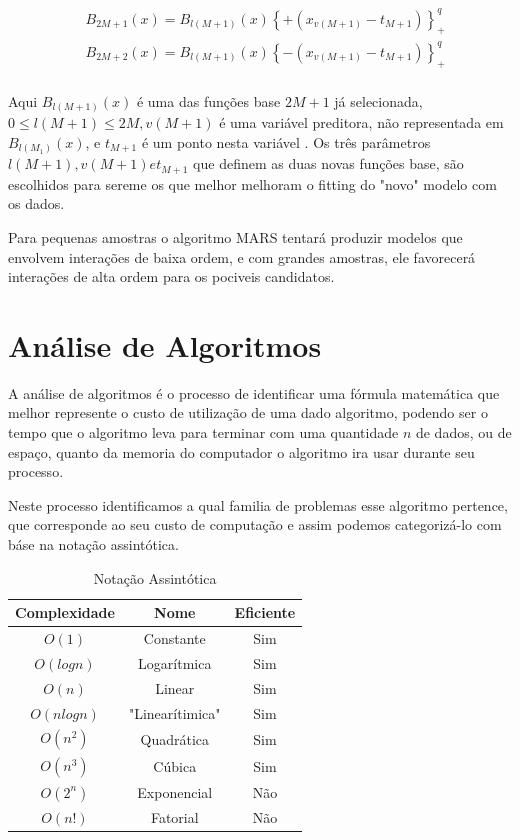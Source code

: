 \documentclass[
	12pt,				%
	openright,			%
	oneside,			%
	a4paper,			%
	english,			%
	brazil				%
	]{abntex2}
\begin{document}
\begin{equation}
	\label{novas_funcoes}
	\begin{split}
		& B_{2M+1}(x) = B_{l(M+1)}(x)\left\{+(x_{v(M+1)}-t_{M+1})\right\}_{+}^{q} \\
		& B_{2M+2}(x) = B_{l(M+1)}(x)\left\{-(x_{v(M+1)}-t_{M+1})\right\}_{+}^{q} \\
	\end{split}
\end{equation}

Aqui $B_{l(M+1)}(x)$ é uma das funções base $2M + 1$ já selecionada, $0 \leq l(M+1) \leq 2M, v(M+1)$ é uma variável preditora, não
representada em $B_{l(M_1)}(x)$, e $t_{M+1}$ é um ponto nesta variável . Os três parâmetros $l(M+1), v(M+1) e t_{M+1}$ que definem as
duas novas funções base, são escolhidos para sereme os que melhor melhoram o fitting do "novo" modelo com os dados.

Para pequenas amostras o algoritmo MARS tentará produzir modelos que envolvem interações de baixa ordem, e com grandes amostras, 
ele favorecerá interações de alta ordem para os pociveis candidatos.

\section{Análise de Algoritmos}

A análise de algoritmos é o processo de identificar uma fórmula matemática que melhor represente o custo de
utilização de uma dado algoritmo, podendo ser o tempo que o algoritmo leva para terminar com uma quantidade $n$
de dados, ou de espaço, quanto da memoria do computador o algoritmo ira usar durante seu processo.

Neste processo identificamos a qual familia de problemas esse algoritmo pertence, que corresponde ao seu custo de
computação \cite{introductionAlgorthms} e assim podemos categorizá-lo com báse na notação assintótica.

\begin{table}[H]
	\centering
	\caption{\label{Notação Assintótica}Notação Assintótica}
	\begin{tabular}{|c|c|c|}
	\hline
		Complexidade & Nome & Eficiente \\ \hline
		$O(1)$ & Constante & Sim \\ \hline
		$O(log n)$ & Logarítmica & Sim \\ \hline
		$O(n)$ & Linear & Sim \\ \hline
		$O(n log n)$ & "Linearítimica" & Sim \\ \hline
		$O(n^2)$ & Quadrática & Sim \\ \hline
		$O(n^3)$ & Cúbica & Sim \\ \hline
		$O(2^n)$ & Exponencial & Não \\ \hline
		$O(n!)$ & Fatorial & Não \\ \hline
	\end{tabular}
\end{table}
\end{document}
